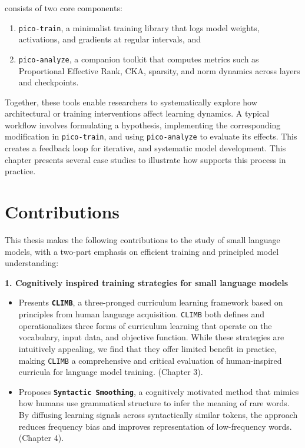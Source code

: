 \begin{itemize}
    \pico consists of two core components:
    
    \begin{enumerate}
        \item \texttt{pico-train}, a minimalist training library that logs model weights, activations, and gradients at regular intervals, and
        
        \item \texttt{pico-analyze}, a companion toolkit that computes metrics such as Proportional Effective Rank, CKA, sparsity, and norm dynamics across layers and checkpoints.
    \end{enumerate}

    Together, these tools enable researchers to systematically explore how architectural or training interventions affect learning dynamics. A typical workflow involves formulating a hypothesis, implementing the corresponding modification in \texttt{pico-train}, and using \texttt{pico-analyze} to evaluate its effects. This creates a feedback loop for iterative, and systematic model development. This chapter presents several case studies to illustrate how \pico supports this process in practice.

\end{itemize}

\section*{Contributions}

This thesis makes the following contributions to the study of small language models, with a two-part emphasis on efficient training and principled model understanding:

\vspace{1em}

\textbf{1. Cognitively inspired training strategies for small language models}

\begin{itemize}

    \item Presents \textbf{\texttt{CLIMB}}, a three-pronged curriculum learning framework based on principles from human language acquisition. \texttt{CLIMB} both defines and operationalizes three forms of curriculum learning that operate on the vocabulary, input data, and objective function. While these strategies are intuitively appealing, we find that they offer limited benefit in practice, making \texttt{CLIMB} a comprehensive and critical evaluation of human-inspired curricula for language model training. (Chapter 3).

    \item Proposes \textbf{\texttt{Syntactic Smoothing}}, a cognitively motivated method that mimics how humans use grammatical structure to infer the meaning of rare words. By diffusing learning signals across syntactically similar tokens, the approach reduces frequency bias and improves representation of low-frequency words. (Chapter 4).

\end{itemize}

